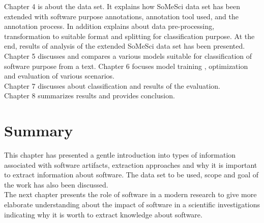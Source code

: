 \noindent Chapter 4 is about the data set.  It explains how \ac{SoMeSci} data set has been extended with software purpose annotations, annotation tool used, and the annotation process. In addition explains about data pre-processing, transformation to suitable format and splitting for classification purpose. At the end, results of analysis of the extended \ac{SoMeSci} data set has been presented. \\

\noindent Chapter 5 discusses and compares a various models suitable for  classification of software purpose from a text. 
\noindent Chapter 6 focuses model training , optimization and evaluation of various scenarios. \\

\noindent Chapter 7 discusses about classification and results  of the evaluation. \\

\noindent Chapter 8 summarizes results and provides conclusion.

\section{Summary}
\label{sec:intro:Summary}

\indent This chapter has presented a gentle introduction into types of information associated with software artifacts, extraction approaches and why it is important to extract information about software. The data set to be used, scope and goal of the work has also been discussed. \\

The next chapter presents the role of software in a modern research to give more elaborate understanding about the impact of software in a scientific investigations indicating why it is worth to extract knowledge about software.  

\clearpage
